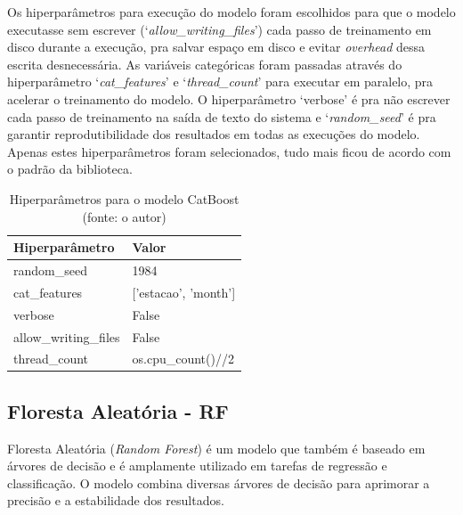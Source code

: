 Os hiperparâmetros para execução do modelo foram escolhidos para que o modelo executasse sem escrever (`\textit{allow\_writing\_files}') cada passo de treinamento em disco durante a execução, pra salvar espaço em disco e evitar \textit{overhead} dessa escrita desnecessária. As variáveis categóricas foram passadas através do hiperparâmetro `\textit{cat\_features}' e `\textit{thread\_count}' para executar em paralelo, pra acelerar o treinamento do modelo. O hiperparâmetro `verbose' é pra não escrever cada passo de treinamento na saída de texto do sistema e `\textit{random\_seed}' é pra garantir reprodutibilidade dos resultados em todas as execuções do modelo. Apenas estes hiperparâmetros foram selecionados, tudo mais ficou de acordo com o padrão da biblioteca.

\begin{table}[!h]
	\centering \small
	\caption{Hiperparâmetros para o modelo CatBoost\\(fonte: o autor)}
	\begin{tabular}{|l|l|} \hline 
		\textbf{Hiperparâmetro} & \textbf{Valor} \\\hline
		random\_seed            & 1984                 \\\hline
		cat\_features           & ['estacao', 'month'] \\\hline
		verbose                 & False                \\\hline
		allow\_writing\_files   & False                \\\hline
		thread\_count           & os.cpu\_count()//2   \\\hline
	\end{tabular}
	\label{tab:hiperparametros_catboost}
\end{table}


\subsection{Floresta Aleatória - RF}

Floresta Aleatória (\textit{Random Forest}) é um modelo que também é baseado em árvores de decisão e é amplamente utilizado em tarefas de regressão e classificação. O modelo combina diversas árvores de decisão para aprimorar a precisão e a estabilidade dos resultados.

